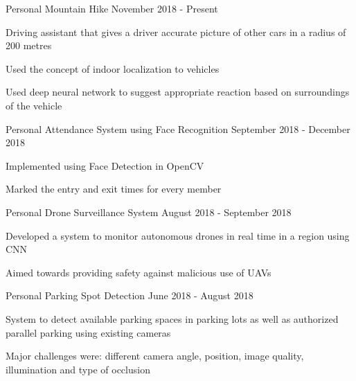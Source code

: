 \begin{cventries}
\cventry
    {Personal}
    {Mountain Hike}
    {}
    {November 2018 - Present}
    {
     \begin{cvitems} %
        \item {Driving assistant that gives a driver accurate picture of other cars in a radius of 200 metres}
        \item {Used the concept of indoor localization to vehicles}
        \item {Used deep neural network to suggest appropriate reaction based on surroundings of the vehicle}
      \end{cvitems}
    }

\cventry
    {Personal}
    {Attendance System using Face Recognition}
    {}
    {September 2018 - December 2018}
    {
     \begin{cvitems} %
        \item {Implemented using Face Detection in OpenCV}
    \item {Marked the entry and exit times for every member}
      \end{cvitems}
    }


\cventry
    {Personal}
    {Drone Surveillance System}
    {}
    {August 2018 - September 2018}
    {
     \begin{cvitems} %
        \item {Developed a system to monitor autonomous drones in real time in a region using CNN}
        \item{Aimed towards providing safety against malicious use of UAVs}
      \end{cvitems}
    }


\cventry
    {Personal}
    {Parking Spot Detection}
    {}
    {June 2018 - August 2018}
    {
     \begin{cvitems} %
        \item {System to detect available parking spaces in parking lots as well as authorized parallel parking using existing cameras}
        \item{Major challenges were: different camera angle, position, image quality, illumination and type of occlusion}
      \end{cvitems}
    }

\end{cventries}



